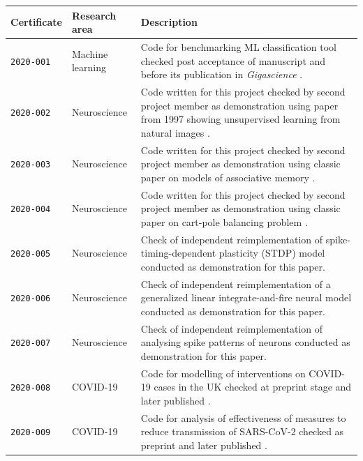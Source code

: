 \documentclass[12pt]{article}
\begin{document}
\begin{table}
  \footnotesize

  \centering

  \begin{tabular}{llp{12cm}}
    \toprule
    \textbf{Certificate} & \textbf{Research area} & \textbf{Description} \\ \midrule
    \texttt{2020-001} \cite{cert-2020-001} & Machine learning & Code for benchmarking ML classification tool checked post acceptance of manuscript and before its publication in \textit{Gigascience} \cite{Piccolo2020-lo}. \\
    \texttt{2020-002}  \cite{cert-2020-002} & Neuroscience & Code written for this project checked by second project member as demonstration using paper from 1997 showing unsupervised learning from natural images \cite{Hancock1992-mp}. \\
    \texttt{2020-003}  \cite{cert-2020-003} & Neuroscience &  Code written for this project checked by second project member as demonstration using classic paper on models of associative memory \cite{Hopfield1982-mz}. \\
    \texttt{2020-004}  \cite{cert-2020-004} & Neuroscience & Code written for this project checked by second project member as demonstration using classic paper on cart-pole balancing problem \cite{Barto1983-rg}. \\
    \texttt{2020-005}  \cite{cert-2020-005} & Neuroscience & Check of independent reimplementation of spike-timing-dependent plasticity (STDP) model \cite{larisch_re_2019} conducted as demonstration for this paper. \\ %
    \texttt{2020-006}  \cite{cert-2020-006} & Neuroscience & Check of independent reimplementation of a generalized linear integrate-and-fire neural model \cite{detorakis_re_2017} conducted as demonstration for this paper. \\
    \texttt{2020-007}  \cite{cert-2020-007} & Neuroscience & Check of independent reimplementation of analysing spike patterns of neurons \cite{hathway_re_2018} conducted as demonstration for this paper. \\
    \texttt{2020-008}  \cite{cert-2020-008} & COVID-19 & Code for modelling of interventions on COVID-19 cases in the UK checked at preprint stage \cite{davies-preprint-2020} and later published \cite{Davies2020-vj}. \\
    \texttt{2020-009}  \cite{cert-2020-009} & COVID-19 & Code for analysis of effectiveness of measures to reduce transmission of SARS-CoV-2 checked as preprint \cite{kucharski-preprint-2020} and later published \cite{kucharski_effectiveness_2020}. \\ %

\end{tabular}
\end{table}
\end{document}
